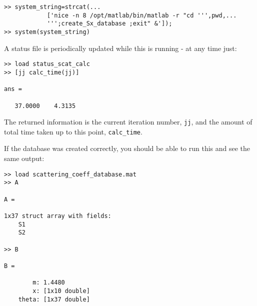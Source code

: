 \begin{verbatim}
>> system_string=strcat(...
            ['nice -n 8 /opt/matlab/bin/matlab -r "cd ''',pwd,...
            ''';create_Sx_database ;exit" &']);
>> system(system_string)
\end{verbatim}

A status file is periodically updated while this is running - at any time just:

\begin{verbatim}
>> load status_scat_calc
>> [jj calc_time(jj)]

ans =

   37.0000    4.3135

\end{verbatim}

The returned information is the current iteration number, \texttt{jj}, and the amount of total time taken up to this point, \texttt{calc\_time}.

If the database was created correctly, you should be able to run this and see the same output:

\begin{verbatim}
>> load scattering_coeff_database.mat
>> A

A = 

1x37 struct array with fields:
    S1
    S2

>> B

B = 

        m: 1.4480
        x: [1x10 double]
    theta: [1x37 double]          

\end{verbatim}

